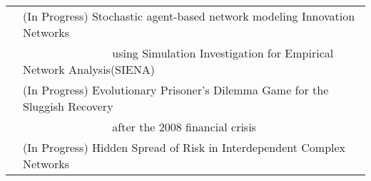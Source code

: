 \documentclass[a4paper,10pt]{article}
\begin{document}
\begin{tabular}{rl}
 & (In Progress) Stochastic agent-based network modeling Innovation Networks \\
&~~~~~~~~~~~~~~~ using Simulation Investigation for Empirical Network Analysis(SIENA)\\ 

&(In Progress) Evolutionary Prisoner's Dilemma Game for the Sluggish Recovery\\ &~~~~~~~~~~~~~~~ after the 2008 financial crisis\\
&(In Progress) Hidden Spread of Risk in Interdependent Complex Networks\\
 

\end{tabular}







\end{document}
